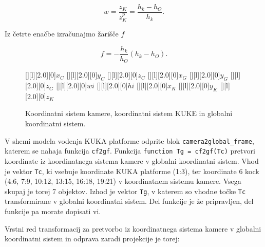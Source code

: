 \begin{equation}
w = \frac{z_K}{z^p_K} = \frac{h_k - h_O}{h_k}.
\end{equation}

Iz četrte enačbe izračunajmo žarišče $f$

\begin{equation}
f =  -\frac{h_k}{h_O}(h_k-h_O).
\end{equation}


\begin{figure}[h]
[][l][2.0][0]{$x_C$}
[][l][2.0][0]{$y_C$}
[][l][2.0][0]{$z_C$}
[][l][2.0][0]{$x_G$}
[][l][2.0][0]{$y_G$}
[][l][2.0][0]{$z_G$}
[][l][2.0][0]{$wi$}
[][l][2.0][0]{$hi$}
[][l][2.0][0]{\color{white}$x_K$}
[][l][2.0][0]{\color{white}$y_K$}
[][l][2.0][0]{\color{white}$z_K$}
\centering {}
\caption{Koordinatni sistem kamere, koordinatni sistem KUKE in globalni koordinatni sistem.}
\label{fig:AllFrames}
\end{figure}

V shemi modela vodenja KUKA platforme odprite blok \verb"camera2global_frame", katerem se nahaja funkcija \verb"cf2gf". Funkcija \newline \verb"function Tg = cf2gf(Tc)" pretvori koordinate iz koordinatnega sistema kamere v globalni koordinatni sistem. Vhod je vektor \verb"Tc", ki vsebuje koordinate KUKA platforme (1:3), ter koordinate 6 kock (4:6, 7:9, 10:12, 13:15, 16:18, 19:21) v koordinatnem sistemu kamere. Vsega skupaj je torej 7 objektov. Izhod je vektor \verb"Tg", v katerem so vhodne točke \verb"Tc" transformirane v globalni koordinatni sistem. Del funkcije je že pripravljen, del funkcije pa morate dopisati vi.

Vrstni red transformacij za pretvorbo iz koordinatnega sistema kamere v globalni koordinatni sistem in odprava zaradi projekcije je torej:

